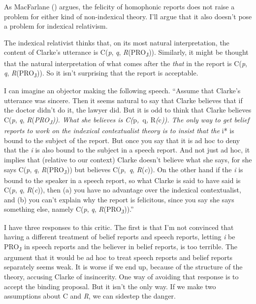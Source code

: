 \documentclass[
  10pt,
  letterpaper,
  DIV=11,
  numbers=noendperiod,
  twoside]{scrartcl}
\begin{document}
As MacFarlane () argues, the
felicity of homophonic reports does not raise a problem for either kind
of non-indexical theory. I'll argue that it also doesn't pose a problem
for indexical relativism.

The indexical relativist thinks that, on its most natural
interpretation, the content of Clarke's utterance is C(\emph{p},
\emph{q}, \emph{R}(PRO\textsubscript{J})). Similarly, it might be
thought that the natural interpretation of what comes after the
\emph{that} in the report is C(\emph{p}, \emph{q},
\emph{R}(PRO\textsubscript{J})). So it isn't surprising that the report
is acceptable.

I can imagine an objector making the following speech. ``Assume that
Clarke's utterance was sincere. Then it seems natural to say that Clarke
believes that if the doctor didn't do it, the lawyer did. But it is odd
to think that Clarke believes C(\emph{p}, \emph{q},
\emph{R}(\emph{PRO\textsubscript{J})). What she believes is
C(}p\emph{,~}q\emph{, }R\emph{(}c\emph{)). The only way to get belief
reports to work on the indexical contextualist theory is to insist that
the }i* is bound to the subject of the report. But once you say that it
is ad hoc to deny that the \emph{i} is also bound to the subject in a
speech report. And not just ad hoc, it implies that (relative to our
context) Clarke doesn't believe what she says, for she says C(\emph{p},
\emph{q}, \emph{R}(PRO\textsubscript{J})) but believes
C(\emph{p},~\emph{q}, \emph{R}(\emph{c})). On the other hand if the
\emph{i} is bound to the speaker in a speech report, so what Clarke is
said to have said is C(\emph{p}, \emph{q}, \emph{R}(\emph{c})), then (a)
you have no advantage over the indexical contextualist, and (b) you
can't explain why the report is felicitous, since you say she says
something else, namely C(\emph{p}, \emph{q},
\emph{R}(PRO\textsubscript{J})).''

I have three responses to this critic. The first is that I'm not
convinced that having a different treatment of belief reports and speech
reports, letting \emph{i} be PRO\textsubscript{J} in speech reports and
the believer in belief reports, is too terrible. The argument that it
would be ad hoc to treat speech reports and belief reports separately
seems weak. It is worse if we end up, because of the structure of the
theory, accusing Clarke of insincerity. One way of avoiding that
response is to accept the binding proposal. But it isn't the only way.
If we make two assumptions about C and \emph{R}, we can sidestep the
danger.
\end{document}
